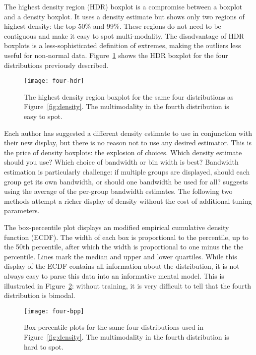 \documentclass[oneside]{article}
\begin{document}
The highest density region (HDR) boxplot \citep{hyndman:1996a} is a compromise between a boxplot and a density boxplot. It uses a density estimate but shows only two regions of highest density: the top 50\% and 99\%. These regions do not need to be contiguous and make it easy to spot multi-modality. The disadvantage of HDR boxplots is a less-sophisticated definition of extremes, making the outliers less useful for non-normal data. Figure~\ref{fig:hdr} shows the HDR boxplot for the four distributions previously described.

\begin{figure}[htbp]
  \centering
    \texttt{[image: four-hdr]}%
  \caption{The highest density region boxplot for the same four distributions as Figure~\ref{fig:density}. The multimodality in the fourth distribution is easy to spot.}
  \label{fig:hdr}
\end{figure}

Each author has suggested a different density estimate to use in conjunction with their new display, but there is no reason not to use any desired estimator. This is the price of density boxplots: the explosion of choices. Which density estimate should you use? Which choice of bandwidth or bin width is best? Bandwidth estimation is particularly challenge: if multiple groups are displayed, should each group get its own bandwidth, or should one bandwidth be used for all? \citet{kampstra:2008} suggests using the average of the per-group bandwidth estimates. The following two methods attempt a richer display of density without the cost of additional tuning parameters.

The box-percentile plot \citep{esty:2003} displays an modified empirical cumulative density function (ECDF). The width of each box is proportional to the percentile, up to the 50th percentile, after which the width is proportional to one minus the the percentile. Lines mark the median and upper and lower quartiles. While this display of the ECDF contains all information about the distribution, it is not always easy to parse this data into an informative mental model. This is illustrated in Figure~\ref{fig:bpp}: without training, it is very difficult to tell that the fourth distribution is bimodal.

\begin{figure}[htbp]
  \centering
  \texttt{[image: four-bpp]}
  \caption{Box-percentile plots for the same four distributions used in Figure~\ref{fig:density}. The multimodality in the fourth distribution is hard to spot.}
  \label{fig:bpp}
\end{figure}
\end{document}
